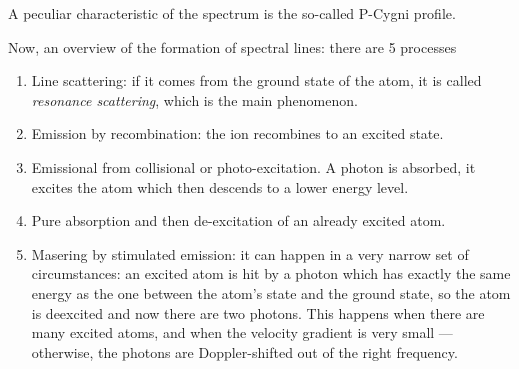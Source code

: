 \documentclass[main.tex]{subfiles}
\begin{document}
A peculiar characteristic of the spectrum is the so-called P-Cygni profile.

Now, an overview of the formation of spectral lines:
there are 5 processes \begin{enumerate}
    \item Line scattering: if it comes from the ground state of the atom, it is called \emph{resonance scattering}, which is the main phenomenon.
    \item Emission by recombination: the ion recombines to an excited state.
    \item Emissional from collisional or photo-excitation. A photon is absorbed, it excites the atom which then descends to a lower energy level.
    \item Pure absorption and then de-excitation of an already excited atom.
    \item Masering by stimulated emission: it can happen in a very narrow set of circumstances: an excited atom is hit by a photon which has exactly the same energy as the one between the atom's state and the ground state, so the atom is deexcited and now there are two photons.
    This happens when there are many excited atoms, and when the velocity gradient is very small --- otherwise, the photons are Doppler-shifted out of the right frequency.
\end{enumerate}
\end{document}
